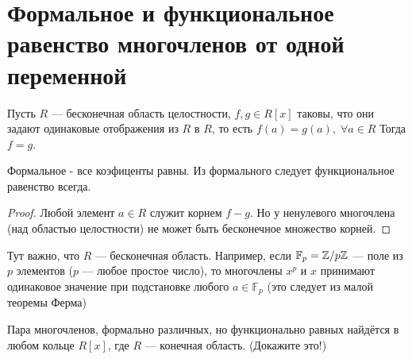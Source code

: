 
\section{Формальное и функциональное равенство многочленов от одной переменной}
\begin{normalsize}
\begin{theorem-non}
    Пусть $R$ --- бесконечная область целостности, $f,g \in R[x]$ таковы,
    что они задают одинаковые отображения из $R$ в $R$, то есть
    $f(a) = g(a),\; \forall a \in R$
    Тогда $f = g$. 
\end{theorem-non}
Формальное - все коэфиценты равны.
Из формального следует функциональное равенство всегда.
\begin{proof}
    Любой элемент $a \in R$ служит корнем $f - g$.
    Но у ненулевого многочлена (над областью целостности) не может
    быть бесконечное множество корней. 
\end{proof}

\notice 
Тут важно, что $R$ --- бесконечная область. Например, если
$\mathbb{F}_p = \mathbb{Z} /p\mathbb{Z}$ --- поле из $p$ элементов ($p$ --- любое простое число), то
многочлены $x^p$ и $x$ принимают одинаковое значение при подстановке любого $a \in \mathbb{F}_p$ (это следует из малой теоремы Ферма)

Пара многочленов, формально различных, но функционально равных найдётся в любом кольце $R[x]$, где $R$ --- конечная область. (Докажите это!)
\end{normalsize}
